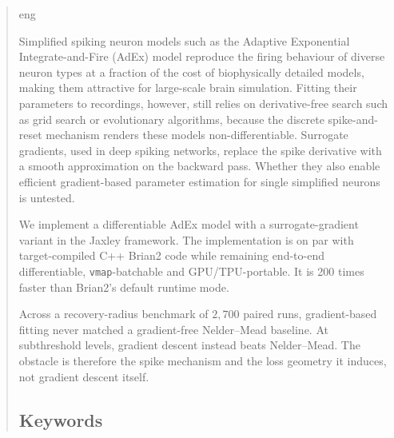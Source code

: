 \documentclass[final, english, biblatex]{kththesis}
\begin{document}
\cleardoublepage
\setcounter{page}{1}
\begin{abstract}
  \markboth{\abstractname}{}
\begin{scontents}[store-env=lang]
eng
\end{scontents}

\begin{scontents}[store-env=abstracts,print-env=true]
Simplified spiking neuron models such as the Adaptive Exponential Integrate-and-Fire (AdEx)
model reproduce the firing behaviour of diverse neuron types at a fraction of the cost of biophysically detailed models,
making them attractive for large-scale brain simulation.
Fitting their parameters to recordings, however, still relies on derivative-free search such as grid search or
evolutionary algorithms, because the discrete spike-and-reset mechanism renders these models non-differentiable.
Surrogate gradients, used in deep spiking networks, replace the spike derivative with a smooth approximation on the backward pass.
Whether they also enable efficient gradient-based parameter estimation for single simplified neurons is untested.

We implement a differentiable AdEx model with a surrogate-gradient variant in the Jaxley framework.
The implementation is on par with target-compiled C++ Brian2 code while remaining end-to-end differentiable, \texttt{vmap}-batchable and GPU/TPU-portable.
It is 200 times faster than Brian2's default runtime mode.

Across a recovery-radius benchmark of $2{,}700$ paired runs,
gradient-based fitting never matched a gradient-free Nelder--Mead baseline.
At subthreshold levels, gradient descent instead beats Nelder--Mead.
The obstacle is therefore the spike mechanism and the loss geometry it induces, not gradient descent itself.
\end{scontents}

\subsection*{Keywords}
\begin{scontents}[store-env=keywords,print-env=true]
\end{scontents}
\end{abstract}
\end{document}
